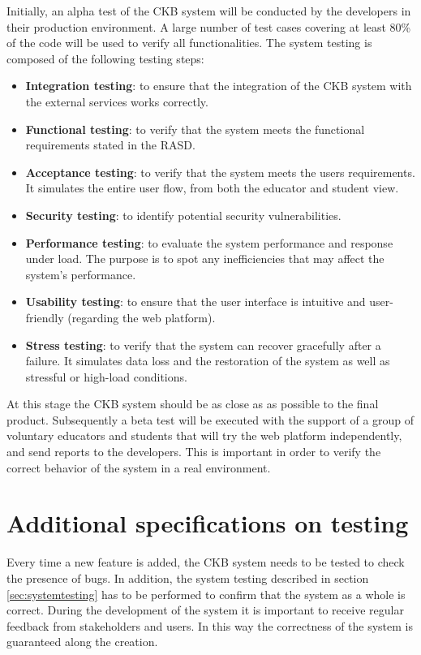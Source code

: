 Initially, an alpha test of the CKB system will be conducted by the developers in their production environment. A large number of test cases covering at least 80\% of the code will be used to verify all functionalities.
The system testing is composed of the following testing steps:
\begin{itemize}
    \item \textbf{Integration testing}: to ensure that the integration of the CKB system with the external services works correctly. 
    \item \textbf{Functional testing}: to verify that the system meets the functional requirements stated in the RASD.
    \item \textbf{Acceptance testing}: to verify that the system meets the users requirements. It simulates the entire user flow, from both the educator and student view.
    \item \textbf{Security testing}: to identify potential security vulnerabilities.
    \item \textbf{Performance testing}: to evaluate the system performance and response under load. The purpose is to spot any inefficiencies that may affect the system's performance. 
    \item \textbf{Usability testing}: to ensure that the user interface is intuitive and user-friendly (regarding the web platform).
    \item \textbf{Stress testing}: to verify that the system can recover gracefully after a failure. It simulates data loss and the restoration of the system as well as stressful or high-load conditions.
\end{itemize}

At this stage the CKB system should be as close as as possible to the final product. Subsequently a beta test will be executed with the support of a group of voluntary educators and students that will try the web platform independently, and send reports to the developers. This is important in order to verify the correct behavior of the system in a real environment.

\section{Additional specifications on testing}
Every time a new feature is added, the CKB system needs to be tested to check the presence of bugs. In addition, the system testing described in section \ref{sec:systemtesting} has to be performed to confirm that the system as a whole is correct. \newline
During the development of the system it is important to receive regular feedback from stakeholders and users. In this way the correctness of the system is guaranteed along the creation.
